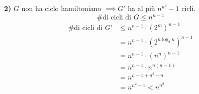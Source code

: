 \textbf{2)} $G$ non ha ciclo hamiltoniano $\implies G'$ ha al più $n^{n^2} - 1$ cicli. \\
$$ \text{\# di cicli di } G \le n^{n-1} $$
\begin{align*}
    \text{\# di cicli di } G' &\le n^{n-1} \cdot (2^m)^{n-1} \\
    &= n^{n-1} \cdot (2^{n \log_2 n})^{n-1} \\
    &= n^{n-1} \cdot (n^n)^{n-1} \\
    &= n^{n-1} \cdot n^{n(n-1)} \\
    &= n^{n-1 + n^2 - n} \\
    &= n^{n^2 - 1} < n^{n^2}
\end{align*}